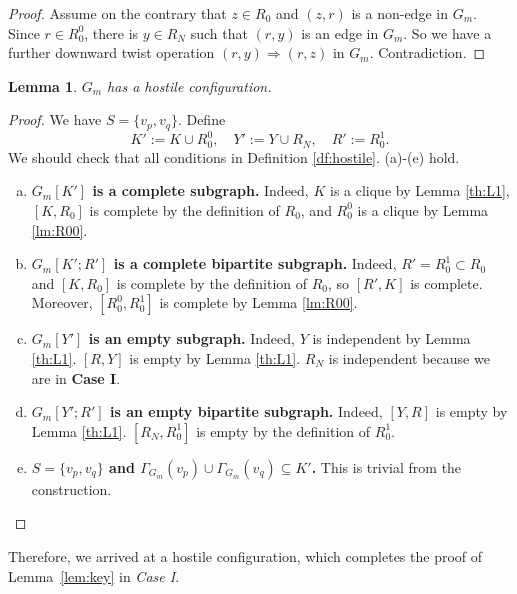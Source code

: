 \documentclass[11pt]{elsarticle}
\theoremstyle{plain}
\newtheorem{lemma}[theorem]{Lemma}
\theoremstyle{definition}
\newcommand{\hflip}[3]{(#1,#2)\Rightarrow (#1,#3)}
\begin{document}
\begin{proof}
Assume on the contrary that $z\in R_0$ and $(z,r)$ is a non-edge in $G_m$.
Since $r\in R^0_0$, there is $y\in R_N$ such that $(r,y)$ is an edge in $G_m$. So we have a  further  downward twist operation  $\hflip{r}{y}{z}$ in $G_m$. Contradiction.
\end{proof}

\begin{lemma}\label{lm:dream-I}
    $G_m$ has  a  hostile configuration.
\end{lemma}
\begin{proof}
We have $S=\{v_p,v_q\}$. Define
\begin{displaymath}
K':= K\cup R_0^0, \quad Y':=Y\cup R_N, \quad R':=R_0^1.
\end{displaymath}
 We should check that all conditions in Definition \ref{df:hostile}. (a)-(e)  hold.

\begin{enumerate}[(a)]
\item {\bf $G_m[K']$  is a complete subgraph.} \quad Indeed, $K$ is a clique by Lemma \ref{th:L1}, $[K,R_0]$ is complete by  the definition of $R_0$, and  $R^0_0$ is a clique by Lemma \ref{lm:R00}.

\item {\bf $G_m[K';R']$ is a complete bipartite subgraph.} \quad
Indeed, $R'=R^1_0\subset R_0$ and $[K,R_0]$ is complete by the definition of $R_0$, so $[R',K]$ is complete. Moreover, $[R^0_0,R^1_0]$ is complete by Lemma \ref{lm:R00}.

\item {\bf $G_m[Y']$ is an empty subgraph.} \quad Indeed, $Y$ is independent by Lemma \ref{th:L1}. $[R,Y]$ is empty by Lemma \ref{th:L1}. $R_N$ is independent because we are in \textbf{Case I}.

\item {\bf $G_m[Y';R']$ is an empty bipartite subgraph.} \quad
Indeed, $[Y,R]$ is empty by Lemma  \ref{th:L1}. $[R_N,R^1_0]$ is empty by the definition of $R^1_0$.

\item {\bf $S=\{v_p,v_q\}$ and   $\Gamma_{G_m}(v_p)\cup \Gamma_{G_m}(v_q) \subseteq K'$.} \quad This is trivial from the construction.
\end{enumerate}
\end{proof}

\noindent
Therefore, we arrived at a hostile configuration, which completes the proof
 of Lemma~\ref{lem:key} in \emph{Case I}.
\end{document}
